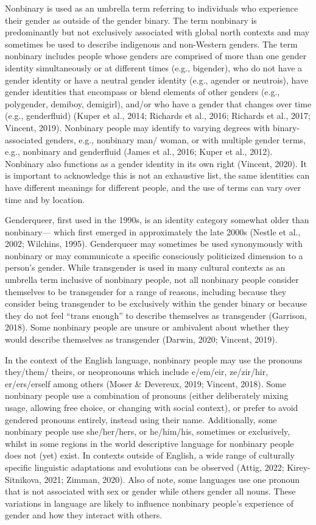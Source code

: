 \documentclass[
]{book}
\begin{document}
Nonbinary is used as an umbrella term referring
to individuals who experience their gender as
outside of the gender binary. The term nonbinary
is predominantly but not exclusively associated
with global north contexts and may sometimes
be used to describe indigenous and non-Western
genders. The term nonbinary includes people
whose genders are comprised of more than one
gender identity simultaneously or at different
times (e.g., bigender), who do not have a gender
identity or have a neutral gender identity (e.g.,
agender or neutrois), have gender identities that
encompass or blend elements of other genders
(e.g., polygender, demiboy, demigirl), and/or who
have a gender that changes over time (e.g., genderfluid) (Kuper et al., 2014; Richards et al., 2016;
Richards et al., 2017; Vincent, 2019). Nonbinary
people may identify to varying degrees with
binary-associated genders, e.g., nonbinary man/
woman, or with multiple gender terms, e.g., nonbinary and genderfluid (James et al., 2016; Kuper
et al., 2012). Nonbinary also functions as a gender identity in its own right (Vincent, 2020). It
is important to acknowledge this is not an
exhaustive list, the same identities can have different meanings for different people, and the use
of terms can vary over time and by location.

Genderqueer, first used in the 1990s, is an identity category somewhat older than nonbinary---
which first emerged in approximately the late 2000s
(Nestle et al., 2002; Wilchins, 1995). Genderqueer
may sometimes be used synonymously with nonbinary or may communicate a specific consciously
politicized dimension to a person's gender. While
transgender is used in many cultural contexts as
an umbrella term inclusive of nonbinary people,
not all nonbinary people consider themselves to
be transgender for a range of reasons, including
because they consider being transgender to be
exclusively within the gender binary or because
they do not feel ``trans enough'' to describe themselves as transgender (Garrison, 2018). Some nonbinary people are unsure or ambivalent about
whether they would describe themselves as transgender (Darwin, 2020; Vincent, 2019).

In the context of the English language, nonbinary people may use the pronouns they/them/
theirs, or neopronouns which include e/em/eir,
ze/zir/hir, er/ers/erself among others (Moser \&
Devereux, 2019; Vincent, 2018). Some nonbinary
people use a combination of pronouns (either
deliberately mixing usage, allowing free choice,
or changing with social context), or prefer to
avoid gendered pronouns entirely, instead using
their name. Additionally, some nonbinary people
use she/her/hers, or he/him/his, sometimes or
exclusively, whilst in some regions in the world
descriptive language for nonbinary people does
not (yet) exist. In contexts outside of English, a
wide range of culturally specific linguistic adaptations and evolutions can be observed (Attig,
2022; Kirey-Sitnikova, 2021; Zimman, 2020). Also
of note, some languages use one pronoun that is
not associated with sex or gender while others
gender all nouns. These variations in language
are likely to influence nonbinary people's experience of gender and how they interact with others.
\end{document}
